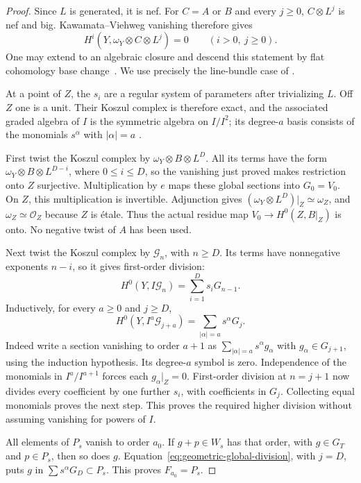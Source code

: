 \begin{proof}
Since $L$ is generated, it is nef.  For $C=A$ or $B$ and every $j\geq0$,
$C\otimes L^j$ is nef and big.  Kawamata--Viehweg vanishing therefore
gives
\[
       H^i(Y,\omega_Y\otimes C\otimes L^j)=0
                      \qquad(i>0,\ j\geq0).
\]
One may extend to an algebraic closure and descend this statement by
flat cohomology base change~\cite[Tag 02KH]{stacks-filtration-regular}.
We use precisely the line-bundle case of
\cite[Theorem 2.28]{viehweg-filtration-vanishing}.

At a point of $Z$, the $s_i$ are a regular system of parameters after
trivializing $L$.  Off $Z$ one is a unit.  Their Koszul complex is
therefore exact, and the associated graded algebra of $I$ is the
symmetric algebra on $I/I^2$; its degree-$a$ basis consists of the
monomials $s^\alpha$ with $|\alpha|=a$
\cite[Lemmas 31.21.1 and 31.21.4]{stacks-filtration-regular}.

First twist the Koszul complex by $\omega_Y\otimes B\otimes L^D$.
All its terms have the form $\omega_Y\otimes B\otimes L^{D-i}$,
where $0\leq i\leq D$, so the vanishing just proved makes restriction
onto $Z$ surjective.  Multiplication by $e$ maps these global sections
into $G_0=V_0$.  On $Z$, this multiplication is invertible.
Adjunction gives $(\omega_Y\otimes L^D)|_Z\simeq\omega_Z$, and
$\omega_Z\simeq\mathcal O_Z$ because $Z$ is \'etale.  Thus the actual
residue map $V_0\to H^0(Z,B|_Z)$ is onto.  No negative twist of $A$
has been used.

Next twist the Koszul complex by $\mathcal G_n$, with $n\geq D$.
Its terms have nonnegative exponents $n-i$, so it gives first-order
division:
\[
 H^0(Y,I\mathcal G_n)=\sum_{i=1}^D s_iG_{n-1}.
\]
Inductively, for every $a\geq0$ and $j\geq D$,
\begin{equation}\label{eq:geometric-global-division}
 H^0(Y,I^a\mathcal G_{j+a})
                  =\sum_{|\alpha|=a}s^\alpha G_j.
\end{equation}
Indeed write a section vanishing to order $a+1$ as
$\sum_{|\alpha|=a}s^\alpha g_\alpha$ with $g_\alpha\in G_{j+1}$,
using the induction hypothesis.  Its degree-$a$ symbol is zero.
Independence of the monomials in $I^a/I^{a+1}$ forces each
$g_\alpha|_Z=0$.  First-order division at $n=j+1$ now divides every
coefficient by one further $s_i$, with coefficients in $G_j$.
Collecting equal monomials proves the next step.  This proves the
required higher division without assuming vanishing for powers of $I$.

All elements of $P_s$ vanish to order $a_0$.  If $g+p\in W_s$ has
that order, with $g\in G_T$ and $p\in P_s$, then so does $g$.
Equation~\eqref{eq:geometric-global-division}, with $j=D$, puts $g$
in $\sum s^\alpha G_D\subset P_s$.  This proves $F_{a_0}=P_s$.


\end{proof}
